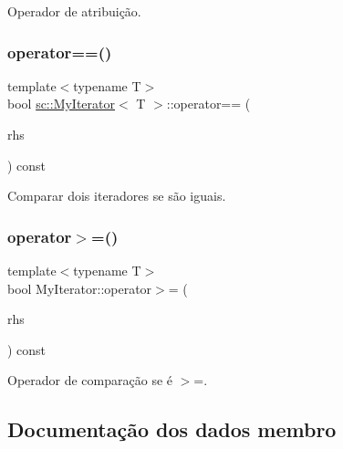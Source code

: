 Operador de atribuição. 

\mbox{\label{classsc_1_1MyIterator_afde62290f677ab0c46f739008e7ed111}} 
\subsubsection{\texorpdfstring{operator==()}{operator==()}}
{\footnotesize\ttfamily template$<$typename T$>$ \\
bool \hyperlink{classsc_1_1MyIterator}{sc\+::\+My\+Iterator}$<$ T $>$\+::operator== (\begin{DoxyParamCaption}\item[{const \hyperlink{classsc_1_1MyIterator}{My\+Iterator}$<$ T $>$ \&}]{rhs }\end{DoxyParamCaption}) const}



Comparar dois iteradores se são iguais. 

\mbox{\label{classsc_1_1MyIterator_ae8dbcb46b7277bc105903ae149670600}} 
\subsubsection{\texorpdfstring{operator$>$=()}{operator>=()}}
{\footnotesize\ttfamily template$<$typename T$>$ \\
bool My\+Iterator\+::operator$>$= (\begin{DoxyParamCaption}\item[{const \hyperlink{classsc_1_1MyIterator}{My\+Iterator}$<$ T $>$ \&}]{rhs }\end{DoxyParamCaption}) const}



Operador de comparação se é $>$=. 



\subsection{Documentação dos dados membro}
\mbox{\label{classsc_1_1MyIterator_a33cc25bbe4f629ffff6f8b85b268f1f1}} 
